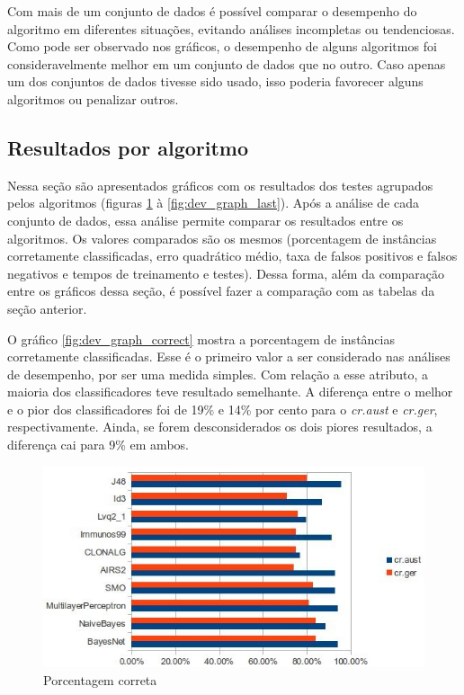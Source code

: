 Com mais de um conjunto de dados é possível comparar o desempenho do algoritmo em diferentes situações, evitando análises incompletas ou tendenciosas. Como pode ser observado nos gráficos, o desempenho de alguns algoritmos foi consideravelmente melhor em um conjunto de dados que no outro. Caso apenas um dos conjuntos de dados tivesse sido usado, isso poderia favorecer alguns algoritmos ou penalizar outros.

\subsection{Resultados por algoritmo}

Nessa seção são apresentados gráficos com os resultados dos testes agrupados pelos algoritmos (figuras \ref{fig:dev_graph_first} à \ref{fig:dev_graph_last}). Após a análise de cada conjunto de dados, essa análise permite comparar os resultados entre os algoritmos. Os valores comparados são os mesmos (porcentagem de instâncias corretamente classificadas, erro quadrático médio, taxa de falsos positivos e falsos negativos e tempos de treinamento e testes). Dessa forma, além da comparação entre os gráficos dessa seção, é possível fazer a comparação com as tabelas da seção anterior.

O gráfico \ref{fig:dev_graph_correct} mostra a porcentagem de instâncias corretamente classificadas. Esse é o primeiro valor a ser considerado nas análises de desempenho, por ser uma medida simples. Com relação a esse atributo, a maioria dos classificadores teve resultado semelhante. A diferença entre o melhor e o pior dos classificadores foi de 19\% e 14\% por cento para o \emph{cr.aust} e \emph{cr.ger}, respectivamente. Ainda, se forem desconsiderados os dois piores resultados, a diferença cai para 9\% em ambos.

\begin{figure}[h!]
    \vspace{0.5cm}
    \centering
    \caption{Porcentagem correta}
    \label{fig:dev_graph_correct}
    \label{fig:dev_graph_first}
    \includegraphics[width=1\textwidth]{img/graph_perc_correct.jpg}
\end{figure}

